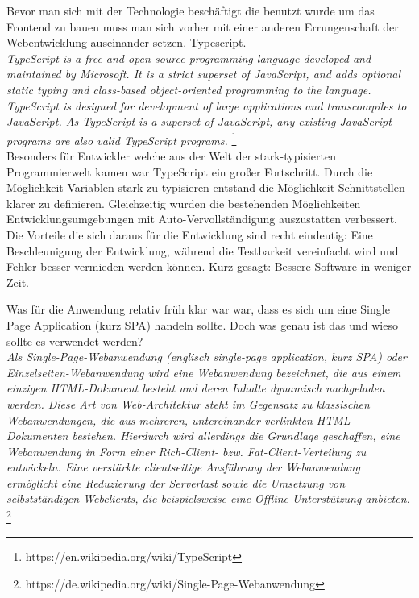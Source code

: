 Bevor man sich mit der Technologie beschäftigt die benutzt wurde um das Frontend zu bauen muss man sich vorher mit einer anderen Errungenschaft der Webentwicklung auseinander setzen. Typescript. \\

\emph{\glqq   
TypeScript is a free and open-source programming language developed and maintained by Microsoft. It is a strict superset of JavaScript, and adds optional static typing and class-based object-oriented programming to the language. \\
TypeScript is designed for development of large applications and transcompiles to JavaScript. As TypeScript is a superset of JavaScript, any existing JavaScript programs are also valid TypeScript programs.
\grqq} \footnote{https://en.wikipedia.org/wiki/TypeScript} \\

Besonders für Entwickler welche aus der Welt der stark-typisierten Programmierwelt kamen war TypeScript ein großer Fortschritt. Durch die Möglichkeit Variablen stark zu typisieren entstand die Möglichkeit Schnittstellen klarer zu definieren. Gleichzeitig wurden die bestehenden Möglichkeiten Entwicklungsumgebungen mit Auto-Vervollständigung auszustatten verbessert. \\
Die Vorteile die sich daraus für die Entwicklung sind recht eindeutig: Eine Beschleunigung der Entwicklung, während die Testbarkeit vereinfacht wird und Fehler besser vermieden werden können. Kurz gesagt: Bessere Software in weniger Zeit.

Was für die Anwendung relativ früh klar war war, dass es sich um eine Single Page Application (kurz SPA) handeln sollte. Doch was genau ist das und wieso sollte es verwendet werden? \\


\emph{\glqq   
Als Single-Page-Webanwendung (englisch single-page application, kurz SPA) oder Einzelseiten-Webanwendung wird eine Webanwendung bezeichnet, die aus einem einzigen HTML-Dokument besteht und deren Inhalte dynamisch nachgeladen werden. Diese Art von Web-Architektur steht im Gegensatz zu klassischen Webanwendungen, die aus mehreren, untereinander verlinkten HTML-Dokumenten bestehen. Hierdurch wird allerdings die Grundlage geschaffen, eine Webanwendung in Form einer Rich-Client- bzw. Fat-Client-Verteilung zu entwickeln. Eine verstärkte clientseitige Ausführung der Webanwendung ermöglicht eine Reduzierung der Serverlast sowie die Umsetzung von selbstständigen Webclients, die beispielsweise eine Offline-Unterstützung anbieten.
\grqq} \footnote{https://de.wikipedia.org/wiki/Single-Page-Webanwendung} \\

